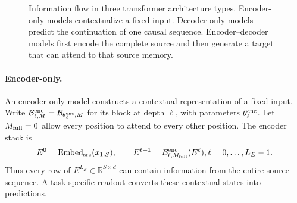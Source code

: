 \documentclass[11pt,twoside]{article}
\newcommand{\R}{\mathbb R}
\theoremstyle{plain}
\theoremstyle{definition}
\theoremstyle{remark}
\begin{document}
\begin{figure}[ht]
{%
}
\caption{Information flow in three transformer architecture types.
Encoder-only models contextualize a fixed input. Decoder-only models predict
the continuation of one causal sequence. Encoder--decoder models first encode
the complete source and then generate a target that can attend to that source
memory.}
\label{fig:transformer-types}
\end{figure}

\paragraph{Encoder-only.}
An encoder-only model constructs a contextual representation of a fixed input.
Write $\mathcal B^{\rm enc}_{\ell,M}=\mathcal B_{\theta^{\rm enc}_\ell,M}$
for its block at depth $\ell$, with parameters $\theta^{\rm enc}_\ell$.
Let $M_{\rm full}=0$ allow every position to attend to every other position.
The encoder stack is
\begin{equation}
E^0=\operatorname{Embed}_{\rm src}(x_{1:S}),
\qquad
E^{\ell+1}=\mathcal B^{\rm enc}_{\ell,M_{\rm full}}(E^\ell),
\quad \ell=0,\ldots,L_E-1.
\label{eq:encoder-stack}
\end{equation}
Thus every row of $E^{L_E}\in\R^{S\times d}$ can contain information from the
entire source sequence. A task-specific readout converts these contextual
states into predictions.
\end{document}
